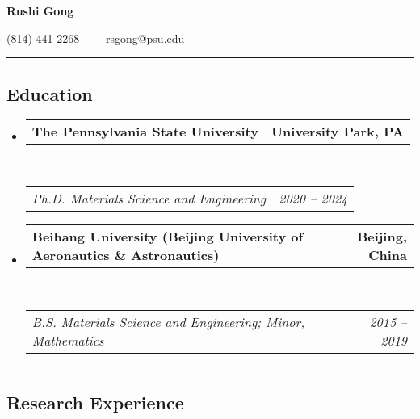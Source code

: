 \documentclass[10pt,letterpaper]{article}
\makeatletter
\newcommand{\headerrow}[2]
{\begin{tabular*}{\linewidth}{l@{\extracolsep{\fill}}r}
  #1 &
  #2 \\
\end{tabular*}}
\makeatother
\begin{document}
\begin{center}
{\LARGE \textbf{Rushi Gong}}



(814) 441-2268\ \ \textbullet
\ \ \href{mailto:rsgong@psu.edu}{rsgong@psu.edu}
\end{center}


\hrule
\vspace{-0.6em}
\subsection*{Education}

\begin{itemize}
  \parskip=0.1em

  \item
  \headerrow
    {\textbf{The Pennsylvania State University}}
    {\textbf{University Park, PA}}
  \\
  \headerrow
    {\emph{Ph.D. Materials Science and Engineering}}
    {\emph{2020 -- 2024}}


  \item
  \headerrow
    {\textbf{Beihang University (Beijing University of Aeronautics \& Astronautics)}}
    {\textbf{Beijing, China}}
  \\
  \headerrow
    {\emph{B.S. Materials Science and Engineering; Minor, Mathematics}}
    {\emph{2015 -- 2019}}

\end{itemize}


\hrule
\vspace{-0.6em}
\subsection*{Research Experience}
\end{document}
